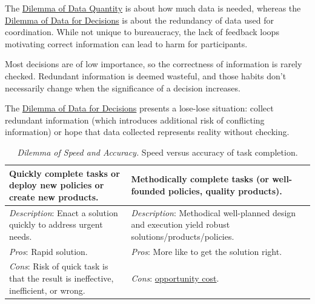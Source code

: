 The \hyperref[table:gather-data-lots-vs-little]{Dilemma of Data Quantity} is about how much data is needed, whereas the \hyperref[table:single-bit-decision]{Dilemma of Data for Decisions} is about the redundancy of data used for coordination. While not unique to bureaucracy, the lack of feedback loops motivating correct information can lead to harm for participants.

Most decisions are of low importance, so the correctness of information is rarely checked. Redundant information is deemed wasteful, and those habits don't necessarily change when the significance of a decision increases. 

The \hyperref[table:single-bit-decision]{Dilemma of Data for Decisions} presents a lose-lose situation: collect redundant information (which introduces additional risk of conflicting information) or hope that data collected represents reality without checking. 



\begin{center}
\begin{table}[H] %
\begin{tabular}{ | m{\dilemmatablewidth}| m{\dilemmatablewidth} | } 
  \hline
  \textbf{Quickly complete tasks or deploy new policies or create new products.} & 
  \textbf{Methodically complete tasks (or well-founded policies, quality products).} \\ 
  \hline
  \textit{Description}: Enact a solution quickly to address urgent needs. &
  \textit{Description}: Methodical well-planned design and execution yield robust solutions/products/policies. \\
  \hline
  \textit{Pros}: Rapid solution. &
  \textit{Pros}: More like to get the solution right. \\
  \hline
  \textit{Cons}: Risk of quick task is that the result is ineffective, inefficient, or wrong. &
  \textit{Cons}: \href{https://en.wikipedia.org/wiki/Opportunity_cost}{opportunity cost}. 
  \index{Wikipedia!\href{https://en.wikipedia.org/wiki/Opportunity_cost}{opportunity cost}}
  \\  
  \hline
\end{tabular}
\caption{
\textit{Dilemma of Speed and Accuracy.}
Speed versus accuracy of task completion.
}
\label{table:quick-methodical}
\end{table}
\end{center}


